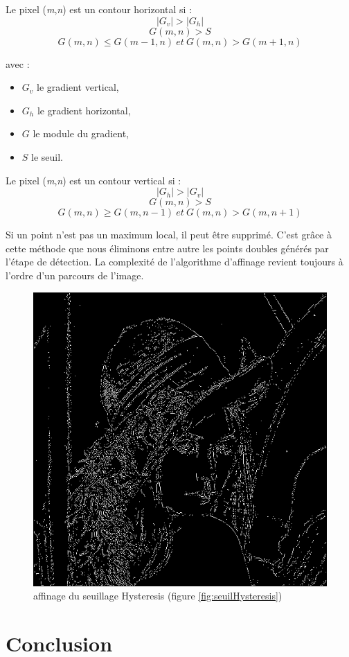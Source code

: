 \documentclass[11pt]{article}
\begin{document}
	Le pixel (\textit{m},\textit{n}) est un contour horizontal si : \\
	$$
		|G_{v}| > |G_{h}| 
	$$	
	$$
		G(m,n) > S 
	$$	
	$$
		G(m,n) \le G(m - 1, n)\ et\ G(m, n) > G(m + 1, n) 
    $$

    avec : 
    \begin{itemize}
	    \item $G_{v}$ le gradient vertical,
	    \item $G_{h}$ le gradient horizontal,
	    \item $G$ le module du gradient,
	    \item $S$ le seuil.

    \end{itemize}

    Le pixel (\textit{m},\textit{n}) est un contour vertical si : \\
	$$
		|G_{h}| > |G_{v}| 
	$$	
	$$
		G(m,n) > S 
	$$	
	$$
		G(m,n) \ge G(m, n - 1)\ et\ G(m, n) > G(m , n + 1) 
    $$

    

    Si un point n'est pas un maximum local, il peut être supprimé. 
    C’est grâce à cette méthode que nous éliminons entre autre les points doubles générés par l’étape de détection. 
    La complexité de l’algorithme d’affinage revient toujours à l’ordre d’un parcours de l’image.

	\begin{figure}[H]
		\centering
		\includegraphics[scale=0.25]{Image/affinage.png}
		\caption{affinage du seuillage Hysteresis (figure \ref{fig:seuilHysteresis})}
		\label{fig:affinage}
	\end{figure} 

\section{Conclusion}
\end{document}
